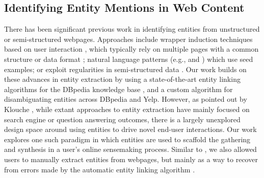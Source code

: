 \subsection{Identifying Entity Mentions in Web Content}

There has been significant previous work in identifying entities from unstructured or semi-structured webpages. Approaches include wrapper induction techniques based on user interaction \cite{thresher}, which typically rely on multiple pages with a common structure or data format \cite{pasupat2014zero}; natural language patterns (e.g., \cite{hearst1992automatic} and \cite{fader2011identifying}) which use seed examples; or exploit regularities in semi-structured data \cite{thresher}. Our work builds on these advances in entity extraction by using a state-of-the-art entity linking algorithms for the DBpedia knowledge base \cite{spotlight,dbpedia}, and a custom algorithm for disambiguating entities across DBpedia and Yelp. However, as pointed out by Klouche \cite{klouche2018hyperlinks}, while extant approaches to entity extraction have mainly focused on search engine or question answering outcomes, there is a largely unexplored design space around using entities to drive novel end-user interactions. Our work explores one such paradigm in which entities are used to scaffold the gathering and synthesis in a user's online sensemaking process. Similar to \cite{thresher}, we also allowed users to manually extract entities from webpages, but mainly as a way to recover from errors made by the automatic entity linking algorithm \cite{spotlight}.

